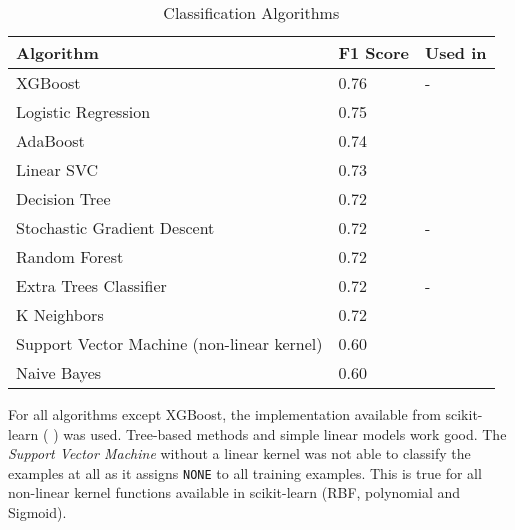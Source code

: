 \begin{table}[h]
\centering
\label{tbl:algo}
\caption{Classification Algorithms}
\begin{tabularx}{\textwidth}{XlX}
\toprule
Algorithm & F1 Score & Used in\\ \midrule

XGBoost & 0.76 & -\\ 

Logistic Regression & 0.75 &  \cite{Dusmanu2017Argument-Mining,Daxenberger2017What-is-the-EssAker2017What-works-and-,Lippi2016Argumentation-M}\\ 

AdaBoost & 0.74 &  \cite{Aker2017What-works-and-}\\  

Linear SVC & 0.73 & \cite{Aker2017What-works-and-}\\  

Decision Tree & 0.72 &  \cite{Stab2014Identifying-Arg,Lippi2016Argumentation-M}\\ 

Stochastic Gradient Descent & 0.72 & -\\ 


Random Forest & 0.72 &  \cite{Dusmanu2017Argument-Mining,Stab2014Identifying-Arg,Eckle-Kohler2015On-the-Role-of-,Aker2017What-works-and-,Lippi2016Argumentation-M}\\  

Extra Trees Classifier & 0.72 & - \\

K Neighbors & 0.72 &  \cite{Aker2017What-works-and-}\\ 


Support Vector Machine (non-linear kernel) & 0.60 & \cite{Stab2014Identifying-Arg,Eckle-Kohler2015On-the-Role-of-,Park:2012:ICC:2391171.2391173,Lippi2016Argumentation-M,Habernal2016Argumentation-M}\\ 


Naive Bayes & 0.60 & \cite{Stab2014Identifying-Arg,Eckle-Kohler2015On-the-Role-of-,Aker2017What-works-and-,Park:2012:ICC:2391171.2391173,Lippi2016Argumentation-M}\\  


 \bottomrule 
\end{tabularx}

\end{table}


For all algorithms except XGBoost, the implementation available from scikit-learn (\cite{scikit-learn} ) was used. Tree-based methods and simple linear models work good. The \emph{Support Vector Machine} without a linear kernel was not able to classify the examples at all as it assigns \texttt{NONE} to all training examples. This is true for all non-linear kernel functions available in scikit-learn (RBF, polynomial and Sigmoid).

